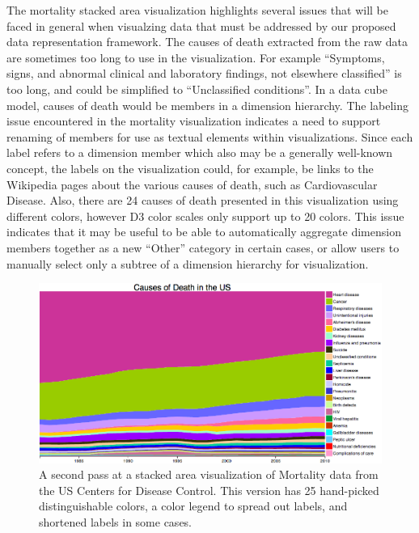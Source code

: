 \documentclass[12pt]{article}
\begin{document}
\begin{doublespace}
The mortality stacked area visualization highlights several issues that will be faced in general when visualzing data that must be addressed by our proposed data representation framework. The causes of death extracted from the raw data are sometimes too long to use in the visualization. For example ``Symptoms, signs, and abnormal clinical and laboratory findings, not elsewhere classified'' is too long, and could be simplified to ``Unclassified conditions''. In a data cube model, causes of death would be members in a dimension hierarchy. The labeling issue encountered in the mortality visualization indicates a need to support renaming of members for use as textual elements within visualizations. Since each label refers to a dimension member which also may be a generally well-known concept, the labels on the visualization could, for example, be links to the Wikipedia pages about the various causes of death, such as Cardiovascular Disease. Also, there are 24 causes of death presented in this visualization using different colors, however D3 color scales only support up to 20 colors. This issue indicates that it may be useful to be able to automatically aggregate dimension members together as a new ``Other'' category in certain cases, or allow users to manually select only a subtree of a dimension hierarchy for visualization.


\begin{figure}[h!]
  \centering
  \includegraphics[width=\textwidth]{figures/mortalityVisV2.png}
  \caption[CDC Mortality Visualization Version 2.]
   {A second pass at a stacked area visualization of Mortality data from the US Centers for Disease Control. This version has 25 hand-picked distinguishable colors, a color legend to spread out labels, and shortened labels in some cases.}
  \label{fig:mortalityVisV2}
\end{figure}


\end{doublespace}
\end{document}
